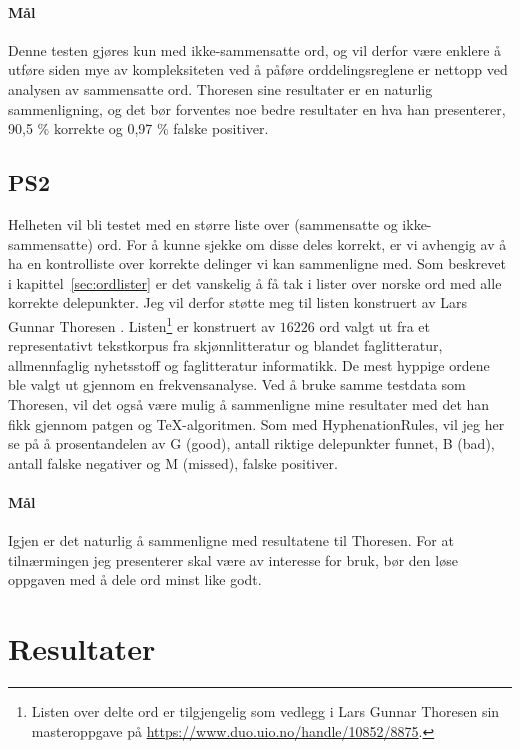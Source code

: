 \paragraph{Mål} Denne testen gjøres kun med ikke-sammensatte ord, og vil derfor være enklere å utføre siden mye av kompleksiteten ved å påføre orddelingsreglene er nettopp ved analysen av sammensatte ord. Thoresen \cite{thoresen1993virtuelle} sine resultater er en naturlig sammenligning, og det bør forventes noe bedre resultater en hva han presenterer, 90,5 \% korrekte og 0,97 \% falske positiver.

\subsection{PS2}

Helheten vil bli testet med en større liste over (sammensatte og ikke-sammensatte) ord. For å kunne sjekke om disse deles korrekt, er vi avhengig av å ha en kontrolliste over korrekte delinger vi kan sammenligne med. Som beskrevet i kapittel~\ref{sec:ordlister} er det vanskelig å få tak i lister over norske ord med alle korrekte delepunkter. Jeg vil derfor støtte meg til listen konstruert av Lars Gunnar Thoresen \cite{thoresen1993virtuelle}. Listen\footnote{Listen over delte ord er tilgjengelig som vedlegg i Lars Gunnar Thoresen sin masteroppgave på \url{https://www.duo.uio.no/handle/10852/8875}.} er konstruert av $16226$ ord valgt ut fra et representativt tekstkorpus fra skjønnlitteratur og blandet faglitteratur, allmennfaglig nyhetsstoff og faglitteratur informatikk. De mest hyppige ordene ble valgt ut gjennom en frekvensanalyse. Ved å bruke samme testdata som Thoresen, vil det også være mulig å sammenligne mine resultater med det han fikk gjennom patgen og \TeX{}-algoritmen. Som med HyphenationRules, vil jeg her se på å prosentandelen av G (good), antall riktige delepunkter funnet, B (bad), antall falske negativer og M (missed), falske positiver.

\paragraph{Mål} Igjen er det naturlig å sammenligne med resultatene til Thoresen. For at tilnærmingen jeg presenterer skal være av interesse for bruk, bør den løse oppgaven med å dele ord minst like godt. 

\section{Resultater}

